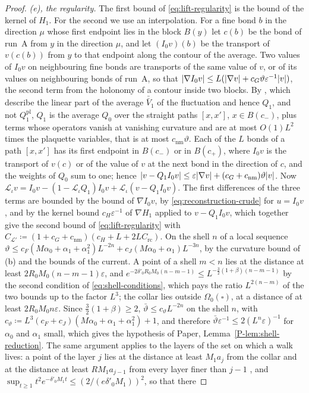 \documentclass[11pt]{preprint}
\DeclarePairedDelimiter{\abs}{\lvert}{\rvert}
\numberwithin{equation}{section}
\theoremstyle{definition}
\theoremstyle{remark}
\theoremstyle{plain}
\begin{document}
\begin{proof}
\emph{(e), the regularity.} The first bound of \eqref{eq:lift-regularity} is the bound of the kernel of $H_1$. For the second we use an interpolation. For a fine bond $b$ in the direction $\mu$ whose first endpoint lies in the block $B(y)$ let $c(b)$ be the bond of run~A from $y$ in the direction $\mu$, and let $(I_0v)(b)$ be the transport of $v(c(b))$ from $y$ to that endpoint along the contour of the average. Two values of $I_0v$ on neighbouring fine bonds are transports of the same value of $v$, or of its values on neighbouring bonds of run~A, so that $\abs{\nabla I_0v} \leq L(\abs{\nabla v} + c_G\vartheta\varepsilon^{-1}\abs v)$, the second term from the holonomy of a contour inside two blocks. By \cite[(124), (125), p.~36]{BalabanAVG}, which describe the linear part of the average $\bar{\bar V}_1$ of the fluctuation and hence $Q_1$, and not $Q^{\mathrm{pl}}_1$, $Q_1$ is the average $Q_0$ over the straight paths $[x, x']$, $x \in B(c_-)$, plus terms whose operators vanish at vanishing curvature and are at most $O(1)L^2$ times the plaquette variables, that is at most $c_{\mathrm{nm}}\vartheta$. Each of the $L$ bonds of a path $[x, x']$ has its first endpoint in $B(c_-)$ or in $B(c_+)$, where $I_0v$ is the transport of $v(c)$ or of the value of $v$ at the next bond in the direction of $c$, and the weights of $Q_0$ sum to one; hence $\abs{v - Q_1I_0v} \leq \varepsilon\abs{\nabla v} + (c_G + c_{\mathrm{nm}})\vartheta\abs v$. Now $\mathcal L_\iota v = I_0v - (1 - \mathcal L_\iota Q_1)I_0v + \mathcal L_\iota(v - Q_1I_0v)$. The first differences of the three terms are bounded by the bound of $\nabla I_0v$, by \eqref{eq:reconstruction-crude} for $u = I_0v$, and by the kernel bound $c_H\varepsilon^{-1}$ of $\nabla H_1$ applied to $v - Q_1I_0v$, which together give the second bound of \eqref{eq:lift-regularity} with $C_{\mathcal L'} \coloneqq (1 + c_G + c_{\mathrm{nm}})(c_H + L + 2LC_{\mathrm{rc}})$. On the shell $n$ of a local sequence $\vartheta \leq c_F(M\alpha_0 + \alpha_1 + \alpha_1^2)L^{-2n} + c_J(M\alpha_0 + \alpha_1)L^{-3n}$, by the curvature bound of (b) and the bounds \cite[(3.36), (3.38)]{BalabanPBG} of the current. A point of a shell $m < n$ lies at the distance at least $2R_0M_0(n - m - 1)\varepsilon$, and $e^{-2\delta'_0R_0M_0(n-m-1)} \leq L^{-\frac32(1+\beta)(n-m-1)}$ by the second condition of \eqref{eq:shell-conditions}, which pays the ratio $L^{2(n-m)}$ of the two bounds up to the factor $L^3$; the collar lies outside $\Omega_0(\square)$, at a distance of at least $2R_0M_0n\varepsilon$. Since $\frac32(1 + \beta) \geq 2$, $\bar\vartheta \leq c_\vartheta L^{-2n}$ on the shell $n$, with $c_\vartheta \coloneqq L^3(c_F + c_J)(M\alpha_0 + \alpha_1 + \alpha_1^2) + 1$, and therefore $\bar\vartheta\varepsilon^{-1} \leq 2(L^n\varepsilon)^{-1}$ for $\alpha_0$ and $\alpha_1$ small, which gives the hypothesis of Paper, Lemma~\ref{P-lem:shell-reduction}. The same argument applies to the layers of the set on which a walk lives: a point of the layer $j$ lies at the distance at least $M_1a_j$ from the collar and at the distance at least $RM_1a_{j-1}$ from every layer finer than $j - 1$ \cite[(1), p.~277]{BalabanVAR}, and $\sup_{t \geq 1}t^2e^{-\delta'_0M_1t} \leq (2/(e\delta'_0M_1))^2$, so that there

\end{proof}
\end{document}
